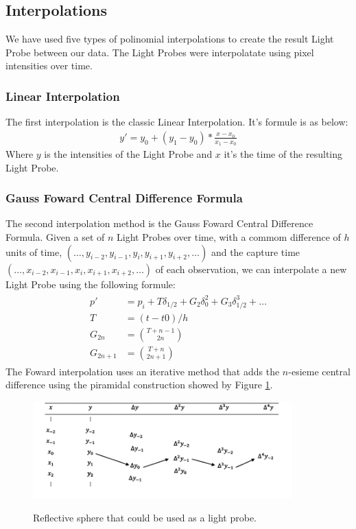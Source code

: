 \documentclass[conference]{acmsiggraph}
\begin{document}
\subsection{Interpolations}
	We have used five types of polinomial interpolations to create the result Light Probe between our data. The Light Probes were interpolatate using pixel intensities over time.
\subsubsection{Linear Interpolation}
	The first interpolation is the classic Linear Interpolation. It's formule is as below: 
\begin{align}
	y' = y_0 + (y_1-y_0)*\frac{x-x_0}{x_1-x_0}
\end{align}
Where $y$ is the intensities of the Light Probe and $x$ it's the time of the resulting Light Probe.

\subsubsection{Gauss Foward Central Difference Formula}
	The second interpolation method is the Gauss Foward Central Difference Formula. Given a set of $n$ Light Probes over time, with a commom difference of $h$ units of time, 
$(\dots,y_{i-2},y_{i-1},y_i,y_{i+1},y_{i+2},\dots)$ and the capture time $(\dots,x_{i-2},x_{i-1},x_i,x_{i+1},x_{i+2},\dots)$ of each observation, we can interpolate a new
Light Probe using the following formule:
\begin{align}
\begin{split}
	p' &= p_i + T \delta_{1/2} + G_2 \delta_0^2 + G_3 \delta_{1/2}^3 + \dots\\
	T &= (t-t0)/h \\
	G_{2n} &= \binom{T+n-1}{2n} \\
	G_{2n+1} &= \binom{T+n}{2n+1}
\end{split}
\end{align}
	The Foward interpolation uses an iterative method that adds the $n$-esieme central difference\cite{abramowitz1972handbook} using the piramidal construction showed by Figure \ref{fig:fowardcentral}.

\begin{figure}[!ht]
	\caption{Reflective sphere that could be used as a light probe.}
	\centering
	\includegraphics[width=10cm]{images/forward.png}
	\label{fig:fowardcentral}
\end{figure}
\end{document}

